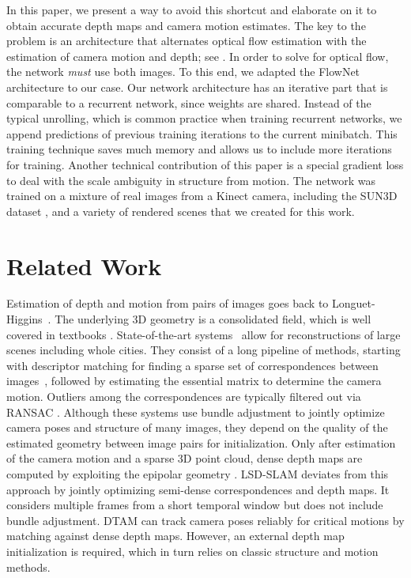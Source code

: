 \documentclass[10pt,twocolumn,letterpaper]{article}
\begin{document}
In this paper, we present a way to avoid this shortcut and elaborate on it to obtain accurate depth maps and camera motion estimates. The key to the problem is an architecture that alternates optical flow estimation with the estimation of camera motion and depth; see . 
In order to solve for optical flow, the network \emph{must} use both images. To this end, we adapted the FlowNet architecture \cite{dosovitskiy_flownet_2015} to our case. 
Our network architecture has an iterative part that is comparable to a recurrent network, since weights are shared. 
Instead of the typical unrolling, which is common practice when training recurrent networks, we append predictions of previous training iterations to the current minibatch.
This training technique saves much memory and allows us to include more iterations for training. 
Another technical contribution of this paper is a special gradient loss to deal with the scale ambiguity in structure from motion. The network was trained on a mixture of real images from a Kinect camera, including the SUN3D dataset \cite{xiao_sun3d_2013}, and a variety of rendered scenes that we created for this work.


\section{Related Work}

Estimation of depth and motion from pairs of images goes back to Longuet-Higgins~\cite{longuet-higgins_computer_1981}. The underlying 3D geometry is a consolidated field, which is well covered in textbooks \cite{Hartley2004,Faugeras1993}.
State-of-the-art systems~\cite{frahm_building_2010,wu_towards_2013} allow for reconstructions of large scenes including whole cities. They consist of a long pipeline of methods, starting with 
descriptor matching for finding a sparse set of correspondences between images~\cite{lowe_distinctive_2004}, followed by estimating the essential matrix to determine the camera motion. Outliers among the correspondences are typically filtered out via RANSAC \cite{fischler_random_1981}.
Although these systems use bundle adjustment \cite{triggs_bundle_2000} to jointly optimize camera poses and structure of many images, they 
depend on the quality of the estimated geometry between image pairs for initialization.
Only after estimation of the camera motion and a sparse 3D point cloud, dense depth maps are computed by exploiting the epipolar geometry \cite{collins_space-sweep_1996}. 
LSD-SLAM \cite{engel14eccv} deviates from this approach by jointly optimizing semi-dense correspondences and depth maps. It considers multiple frames from a short temporal window but does not include bundle adjustment.
DTAM \cite{newcombe_dtam:_2011} can track camera poses reliably for critical motions by matching against dense depth maps.
However, an external depth map initialization is required, which in turn relies on classic structure and motion methods.
\end{document}
